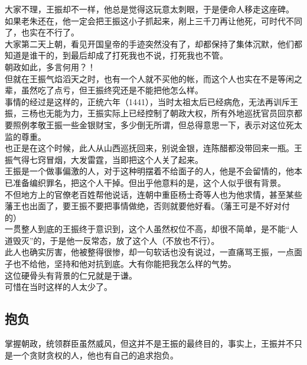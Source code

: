 \begin{multicols}{\theparacolNo}
大家不理，王振却不一样，他总是觉得这玩意太刺眼，于是便命人移走这座碑。\\

如果老朱还在，他一定会把王振这小子抓起来，剐上三千刀再让他死，可时代不同了，也实在不行了。\\

大家第二天上朝，看见开国皇帝的手迹突然没有了，却都保持了集体沉默，他们都知道是谁干的，到最后却成了打死我也不说，打死我也不管。\\

朝政如此，多言何用？！\\

但就在王振气焰滔天之时，也有一个人就不买他的帐，而这个人也实在不是等闲之辈，虽然吃了点亏，但王振终究还是不能把他怎么样。\\

事情的经过是这样的，正统六年（1441），当时太祖太后已经病危，无法再训斥王振，三杨也无能为力，王振实际上已经控制了朝政大权，所有外地巡抚官员回京都要照例孝敬王振一些金银财宝，多少倒无所谓，但总得意思一下，表示对这位死太监的尊重。\\

也正是在这个时候，此人从山西巡抚回来，别说金银，连陈醋都没带回来一瓶。王振气得七窍冒烟，大发雷霆，当即把这个人关了起来。\\

王振是一个做事偏激的人，对于这种明摆着不给面子的人，他是不会留情的，他本已准备编织罪名，把这个人干掉。但出乎他意料的是，这个人似乎很有背景。\\

不但地方上的官僚老百姓帮他说话，连朝中重臣杨士奇等人也为他求情，甚至某些藩王也出面了，要王振不要把事情做绝，否则就要他好看。（藩王可是不好对付的）\\

一贯整人到底的王振终于意识到，这个人虽然权位不高，却很不简单，是不能“人道毁灭”的，于是他一反常态，放了这个人（不放也不行）。\\

此人也确实厉害，他被整得很惨，却一句软话也没有说过，一直痛骂王振，一点面子也不给他，坚持和他对抗到底。大有你能把我怎么样的气势。\\

这位硬骨头有背景的仁兄就是于谦。\\

可惜在当时这样的人太少了。\\

\subsection{抱负}
掌握朝政，统领群臣虽然威风，但这并不是王振的最终目的，事实上，王振并不只是一个贪财贪权的人，他也有自己的追求抱负。\\


\end{multicols}
